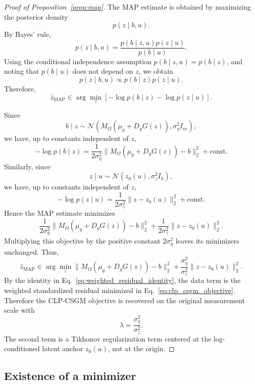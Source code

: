\begin{proof}[Proof of Proposition~\ref{prop:map}]
The MAP estimate is obtained by maximizing the posterior density
\[
  p(z\mid b,u).
\]
By Bayes' rule,
\[
  p(z\mid b,u)
  =
  \frac{p(b\mid z,u)p(z\mid u)}{p(b\mid u)}.
\]
Using the conditional independence assumption \(p(b\mid z,u)=p(b\mid z)\),
and noting that \(p(b\mid u)\) does not depend on \(z\), we obtain
\[
  p(z\mid b,u)\propto p(b\mid z)p(z\mid u).
\]
Therefore,
\[
  \hat z_{\mathrm{MAP}}
  \in
  \arg\min_z
  \left[
    -\log p(b\mid z)-\log p(z\mid u)
  \right].
\]

Since
\[
  b\mid z \sim \mathcal{N}\!\left(M_\Omega(\mu_y+D_y G(z)),\sigma_\eta^2 I_m\right),
\]
we have, up to constants independent of \(z\),
\[
  -\log p(b\mid z)
  =
  \frac{1}{2\sigma_\eta^2}
  \|M_\Omega(\mu_y+D_y G(z))-b\|_2^2
  +
  \mathrm{const}.
\]
Similarly, since
\[
  z\mid u \sim \mathcal{N}(z_0(u),\sigma_z^2 I_k),
\]
we have, up to constants independent of \(z\),
\[
  -\log p(z\mid u)
  =
  \frac{1}{2\sigma_z^2}
  \|z-z_0(u)\|_2^2
  +
  \mathrm{const}.
\]
Hence the MAP estimate minimizes
\[
  \frac{1}{2\sigma_\eta^2}\|M_\Omega(\mu_y+D_y G(z))-b\|_2^2
  +
  \frac{1}{2\sigma_z^2}\|z-z_0(u)\|_2^2.
\]
Multiplying this objective by the positive constant \(2\sigma_\eta^2\) leaves
its minimizers unchanged. Thus,
\[
  \hat z_{\mathrm{MAP}}
  \in
  \arg\min_z
  \|M_\Omega(\mu_y+D_y G(z))-b\|_2^2
  +
  \frac{\sigma_\eta^2}{\sigma_z^2}
  \|z-z_0(u)\|_2^2.
\]
By the identity in Eq.~\eqref{eq:weighted_residual_identity}, the data term
is the weighted standardized residual minimized in
Eq.~\eqref{eq:clp_csgm_objective}. Therefore the CLP-CSGM objective is
recovered on the original measurement scale with
\[
  \lambda=\frac{\sigma_\eta^2}{\sigma_z^2}.
\]
The second term is a Tikhonov regularization term centered at the
log-conditioned latent anchor \(z_0(u)\), not at the origin.
\end{proof}

\subsection{Existence of a minimizer}
\label{app:existence_proof}

